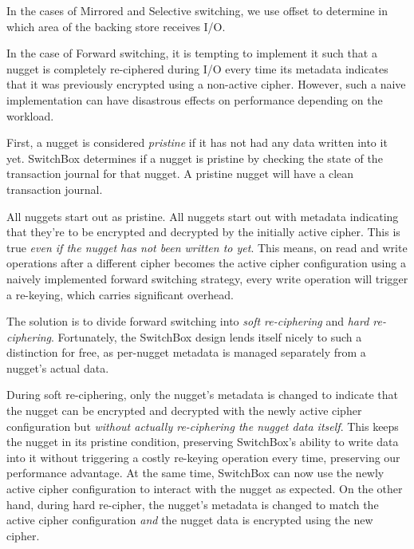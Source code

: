In the cases of Mirrored and Selective switching, we use offset to determine in
which area of the backing store receives I/O.

In the case of Forward switching, it is tempting to implement it such that a
nugget is completely re-ciphered during I/O every time its metadata indicates
that it was previously encrypted using a non-active cipher. However, such a
naive implementation can have disastrous effects on performance depending on the
workload.

First, a nugget is considered \emph{pristine} if it has not had any data written
into it yet. SwitchBox determines if a nugget is pristine by checking the state
of the transaction journal for that nugget. A pristine nugget will have a clean
transaction journal.

All nuggets start out as pristine. All nuggets start out with metadata
indicating that they're to be encrypted and decrypted by the initially active
cipher. This is true \emph{even if the nugget has not been written to yet}. This
means, on read and write operations after a different cipher becomes the active
cipher configuration using a naively implemented forward switching strategy,
every write operation will trigger a re-keying, which carries significant
overhead.

The solution is to divide forward switching into \emph{soft re-ciphering} and
\emph{hard re-ciphering}. Fortunately, the SwitchBox design lends itself nicely
to such a distinction for free, as per-nugget metadata is managed separately
from a nugget's actual data.

During soft re-ciphering, only the nugget's metadata is changed to indicate that
the nugget can be encrypted and decrypted with the newly active cipher
configuration but \emph{without actually re-ciphering the nugget data itself}.
This keeps the nugget in its pristine condition, preserving SwitchBox's ability
to write data into it without triggering a costly re-keying operation every
time, preserving our performance advantage. At the same time, SwitchBox can now
use the newly active cipher configuration to interact with the nugget as
expected. On the other hand, during hard re-cipher, the nugget's metadata is
changed to match the active cipher configuration \emph{and} the nugget data is
encrypted using the new cipher.


